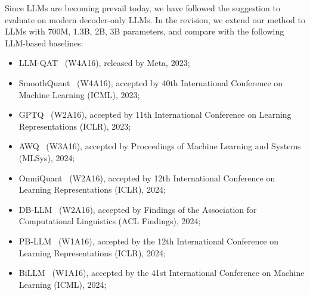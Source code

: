 \begin{revresponse}[]
Since LLMs are becoming prevail today, we have followed the suggestion to evaluate on modern decoder-only LLMs. 
In the revision, we extend our method to LLMs with 700M, 1.3B, 2B, 3B parameters, and compare with the following LLM-based baselines: 
    \begin{itemize}
        \item LLM-QAT~\cite{llm-qat} (W4A16), released by Meta, 2023; 
        \item SmoothQuant~\cite{xiao2023smoothquant} (W4A16), accepted by 40th International Conference on Machine Learning (ICML), 2023; 
        \item GPTQ~\cite{gptq} (W2A16), accepted by 11th International Conference on Learning Representations (ICLR), 2023; %
        \item AWQ~\cite{lin2024awq} (W3A16), accepted by Proceedings of Machine Learning and Systems (MLSys), 2024; 
        \item OmniQuant~\cite{shao2023omniquant} (W2A16),  accepted by  12th International Conference on Learning Representations (ICLR), 2024; 
        \item DB-LLM~\cite{chen2024dbllm} (W2A16), accepted by Findings of the Association for Computational Linguistics (ACL Findings), 2024; 
        \item PB-LLM~\cite{shang2023pbllm} (W1A16), accepted by the 12th International Conference on Learning Representations (ICLR), 2024; 
        \item BiLLM~\cite{huang2024billm} (W1A16), accepted by the 41st International Conference on Machine Learning (ICML), 2024; 

\end{itemize}
\end{revresponse}
